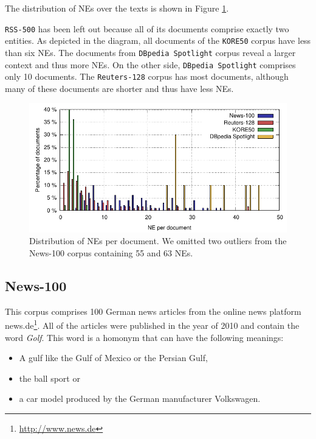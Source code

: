 The distribution of NEs over the texts is shown in Figure \ref{fig:nePerDoc}. 

\texttt{RSS-500} has been left out because all of its documents comprise exactly two entities. 
As depicted in the diagram, all documents of the \texttt{KORE50} corpus have less than six NEs. 
The documents from \texttt{DBpedia Spotlight} corpus reveal a larger context and thus more NEs. 
On the other side, \texttt{DBpedia Spotlight} comprises only 10 documents.
The \texttt{Reuters-128} corpus has most documents, although many of these documents are shorter and thus have less NEs.

\begin{figure}[tb!]
  \centering
  \includegraphics[width=\linewidth]{chapter_three/benchmarking/LREC_N3NIFNERNED/NE_per_doc.pdf}
  \caption{Distribution of NEs per document. We omitted two outliers from the News-100 corpus containing 55 and 63 NEs.}
  \label{fig:nePerDoc}
\end{figure}


\subsection{News-100}

This corpus comprises 100 German news articles from the online news platform news.de\footnote{\url{http://www.news.de}}. 
All of the articles were published in the year of 2010 and contain the word \emph{Golf}.
This word is a homonym that can have the following meanings:
\begin{itemize}
\item A gulf like the Gulf of Mexico or the Persian Gulf,
\item the ball sport or
\item a car model produced by the German manufacturer Volkswagen.
\end{itemize}

